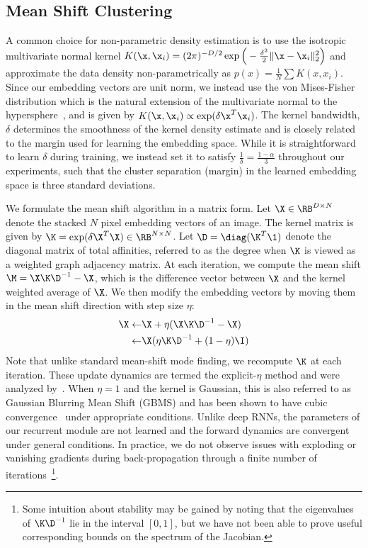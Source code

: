 \subsection{Mean Shift Clustering}
A common choice for non-parametric density estimation is to use the isotropic
multivariate normal kernel $K(\x, \x_i)= (2\pi)^{-D/2}\exp \Big(-
\frac{\delta^2}{2} \Vert\x - \x_i \Vert^2_2 \Big)$ and approximate the data
density non-parametrically as $p(x) = \frac{1}{N} \sum K(x,x_i)$. Since our
embedding vectors are unit norm, we instead use the von Mises-Fisher
distribution which is the natural extension of the multivariate normal to the
hypersphere~\cite{fisher1953dispersion,
banerjee2005clustering,mardia2009directional,kobayashi2010mises},
and is given by $K(\x,\x_i) \propto \exp( \delta \x^T \x_i )$.
The kernel bandwidth, $\delta$ determines the smoothness of the
kernel density estimate and is closely related to the margin used for learning
the embedding space. While it is straightforward to learn $\delta$ during
training, we instead set it to satisfy $\frac{1}{\delta}=\frac{1-\alpha}{3}$
throughout our experiments, such that the cluster separation (margin) in the
learned embedding space is three standard deviations.

We formulate the mean shift algorithm in a matrix form.  Let $\X \in
\RB^{D\times N}$ denote the stacked $N$ pixel embedding vectors of an image.
The kernel matrix is given by $\K = \exp(\delta \X^T\X) \in \RB^{N \times N}$.
Let $\D = \diag(\K^T\1)$ denote the diagonal matrix of total affinities,
referred to as the degree when $\K$ is viewed as a weighted graph
adjacency matrix. At each iteration, we compute the mean shift $\M =
\X\K\D^{-1} - \X$, which is the difference vector between $\X$ and the kernel
weighted average of $\X$. We then modify the embedding vectors by moving
them in the mean shift direction with step size $\eta$:
\begin{equation}
\begin{split}
\X \leftarrow & \X + \eta(\X\K\D^{-1} - \X)\\
\leftarrow & \X (\eta\K\D^{-1} + (1-\eta)\I)\\
\end{split}
\end{equation}
Note that unlike standard mean-shift mode finding, we recompute $\K$ at each
iteration.  These update dynamics are termed the explicit-$\eta$ method and
were analyzed by~\cite{carreira2008generalised}. When $\eta=1$ and the kernel
is Gaussian, this is also referred to as Gaussian Blurring Mean Shift (GBMS)
and has been shown to have cubic convergence~\cite{carreira2008generalised}
under appropriate conditions.  Unlike deep RNNs, the parameters of our
recurrent module are not learned and the forward dynamics are convergent under
general conditions.  In practice, we do not observe issues with exploding or
vanishing gradients during back-propagation through a finite number of
iterations~\footnote{Some intuition about stability may be gained by noting
that the eigenvalues of $\K\D^{-1}$ lie in the interval $[0,1]$, but we have
not been able to prove useful corresponding bounds on the spectrum of the
Jacobian.}.

